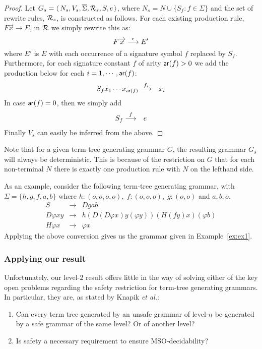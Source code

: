 \begin{proof} Let $G_s = \langle\,{N_s, V_s, \overline{\Sigma}, {\cal R}_s,
S, e}\,\rangle$, where $N_s = N \cup \{S_f : f \in \Sigma\}$ and the set of
rewrite rules, ${\cal R}_s$, is constructed as follows. For each
existing production rule, $F \overrightarrow{x} \rightarrow E$, in
${\cal R}$ we simply rewrite this as:
\begin{equation}
\nonumber F \overrightarrow{x} \stackrel{{\epsilon}}{\longrightarrow} E'
\end{equation}
where $E'$ is $E$ with each occurrence of a signature symbol $f$
replaced by $S_f$. Furthermore, for each signature constant $f$ of
arity ${\sf ar}(f) > 0$ we add the production below for each $i = 1,
\cdots, {\sf ar}(f)$:
\begin{eqnarray}
\nonumber S_f x_1 \cdots x_{{\sf ar}(f)} & \stackrel{{f_i}}{\longrightarrow} & x_i
\end{eqnarray}
In case ${\sf ar}(f) = 0$, then we simply add
\begin{eqnarray}
\nonumber S_f & \stackrel{{f}}{\longrightarrow} & e
\end{eqnarray}
Finally $V_s$ can easily be inferred from the above.
\end{proof}

Note that for a given term-tree generating grammar $G$, the
resulting grammar $G_s$ will always be deterministic. This is
because of the restriction on $G$ that for each non-terminal $N$
there is exactly one production rule with $N$ on the lefthand side.

\begin{example}
As an example, consider the following term-tree generating
grammar, with $\Sigma = \{h,g,f,a,b\}$ where $h: (o,o,o,o), \; f:
(o,o,o), \; g: (o,o)$ and $a, b : o$.
\begin{eqnarray}
\nonumber S & \rightarrow & Dgab \\
\nonumber D\varphi x y & \rightarrow & h(D(D\varphi x)y (\varphi y)) (H (fy) x) (\varphi b)\\
\nonumber H \varphi x & \rightarrow & \varphi x
\end{eqnarray}
Applying the above conversion gives us the grammar given in
Example~\ref{ex:ex1}.
\end{example}

\subsubsection*{Applying our result}

Unfortunately, our level-$2$ result offers little in the way of
solving either of the key open problems regarding the safety
restriction for term-tree generating grammars. In particular, they
are, as stated by Knapik \emph{et al.}:
\begin{enumerate}
\item Can every term tree generated by an unsafe grammar of
level-$n$ be generated by a safe grammar of the same level? Or of
another level? \item Is safety a necessary requirement to ensure
MSO-decidability?
\end{enumerate}

